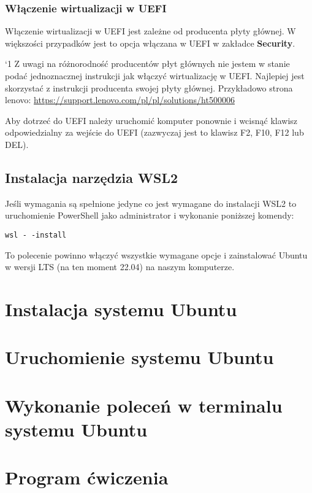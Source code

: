 \documentclass[a4paper,12pt]{article}
\newcommand*{\TakeFourierOrnament}[1]{{%
\fontencoding{U}\fontfamily{futs}\selectfont\char#1}}
\newcommand*{\danger}{\TakeFourierOrnament{`1}}
\begin{document}
\subsubsection{Włączenie wirtualizacji w UEFI}
Włączenie wirtualizacji w UEFI jest zależne od producenta płyty głównej. W większości przypadków jest to opcja włączana w UEFI w zakładce \textbf{Security}.

\begin{tcolorbox}
    \begin{minipage}{1\textwidth}
        \large{\danger}
        Z uwagi na różnorodność producentów płyt głównych nie jestem w stanie podać jednoznacznej instrukcji jak włączyć wirtualizację w UEFI. Najlepiej jest skorzystać z instrukcji producenta swojej płyty głównej. Przykładowo strona lenovo: \url{https://support.lenovo.com/pl/pl/solutions/ht500006}
    \end{minipage}
\end{tcolorbox}

Aby dotrzeć do UEFI należy uruchomić komputer ponownie i wcisnąć klawisz odpowiedzialny za wejście do UEFI (zazwyczaj jest to klawisz F2, F10, F12 lub DEL).

\subsection{Instalacja narzędzia WSL2}
Jeśli wymagania są spełnione jedyne co jest wymagane do instalacji WSL2 to uruchomienie PowerShell jako administrator i wykonanie poniższej komendy:
\begin{lstlisting}
wsl - -install
\end{lstlisting}
To polecenie powinno włączyć wszystkie wymagane opcje i zainstalować Ubuntu w wersji LTS (na ten moment 22.04) na naszym komputerze.
\section{Instalacja systemu Ubuntu}
\section{Uruchomienie systemu Ubuntu}
\section{Wykonanie poleceń w terminalu systemu Ubuntu}
\section{Program ćwiczenia}
\tableofcontents
\end{document}
